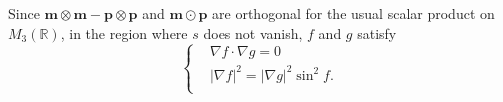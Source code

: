 \documentclass[10pt, a4paper]{article}
\newcommand\m{\mathbf{m}}
\newcommand\p{\mathbf{p}}
\newcommand\pp{\partial}
\begin{document}
Since $\m \otimes \m - \p \otimes \p$ and $\m \odot \p$ are orthogonal for the usual scalar product on $M_3 (\mathbb{R})$, in the region where $s$ does not vanish,  $f$ and $g$ satisfy
\begin{equation}\label{eq_fg}
\begin{cases}
& \nabla f \cdot \nabla g = 0 \\
& |\nabla f|^2 = |\nabla g|^2 \sin^2 f.  \\
\end{cases}
\end{equation}
\end{document}
